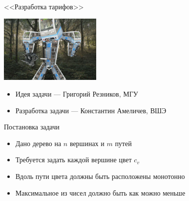 \begin{frame}
  \begin{center}
    \LARGE <<Разработка тарифов>>
  \end{center}

  \begin{center}
      \includegraphics[width=5cm]{d-meme.jpg}
  \end{center}

  \begin{itemize}
  \item Идея задачи --- Григорий Резников, МГУ
  \item Разработка задачи --- Константин Амеличев, ВШЭ
  \end{itemize}

\end{frame}

\begin{frame}{Постановка задачи}

  \begin{itemize}
  \item Дано дерево на $n$ вершинах и $m$ путей
  \item Требуется задать каждой вершине цвет $c_v$
  \item Вдоль пути цвета должны быть расположены монотонно
  \item Максимальное из чисел должно быть как можно меньше
  \end{itemize}
  
\end{frame}

